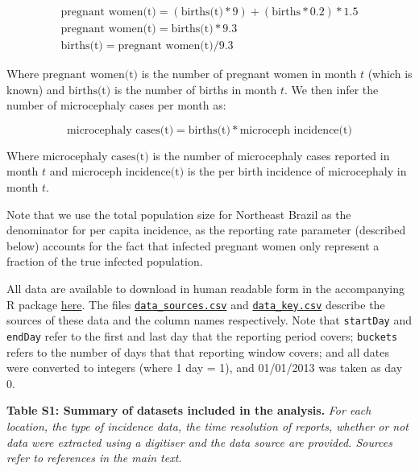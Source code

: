 \documentclass[10pt,letterpaper]{article}
\begin{document}
\begin{equation}
 \begin{array}{lr}
 \text{pregnant women(t)} = (\text{births(t)}*9) + (\text{births}*0.2)*1.5 \\
\text{pregnant women(t)} = \text{births(t)}*9.3 \\
 \text{births(t)} = \text{pregnant women(t)}/9.3
\end{array}
\end{equation}

Where \(\text{pregnant women(t)}\) is the number of pregnant women in
month \(t\) (which is known) and \(\text{births(t)}\) is the number of
births in month \(t\). We then infer the number of microcephaly cases
per month as:

\begin{equation}
\text{microcephaly cases(t)} = \text{births(t)}*\text{microceph incidence(t)}
\end{equation}

Where \(\text{microcephaly cases(t)}\) is the number of microcephaly
cases reported in month \(t\) and \(\text{microceph incidence(t)}\) is
the per birth incidence of microcephaly in month \(t\).

Note that we use the total population size for Northeast Brazil as the
denominator for per capita incidence, as the reporting rate parameter
(described below) accounts for the fact that infected pregnant women
only represent a fraction of the true infected population.

All data are available to download in human readable form in the
accompanying R package
\href{https://github.com/jameshay218/zikaInfer/tree/master/RawData/}{here}.
The files
\href{https://github.com/jameshay218/zikaInfer/tree/master/RawData/data_sources.csv}{\texttt{data\_sources.csv}}
and
\href{https://github.com/jameshay218/zikaInfer/tree/master/RawData/data_key.csv}{\texttt{data\_key.csv}}
describe the sources of these data and the column names respectively.
Note that \texttt{startDay} and \texttt{endDay} refer to the first and
last day that the reporting period covers; \texttt{buckets} refers to
the number of days that that reporting window covers; and all dates were
converted to integers (where 1 day = 1), and 01/01/2013 was taken as day
0.

\textbf{Table S1: Summary of datasets included in the analysis.}
\emph{For each location, the type of incidence data, the time resolution
of reports, whether or not data were extracted using a digitiser and the
data source are provided. Sources refer to references in the main text.}
\tiny
\end{document}

